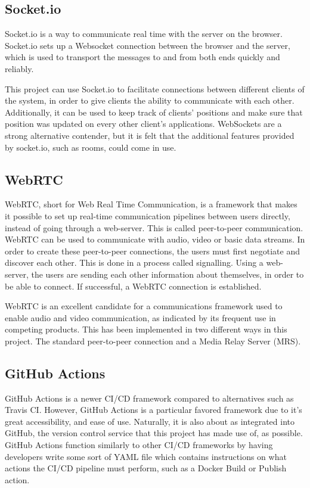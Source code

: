 \subsection{Socket.io}

Socket.io is a way to communicate real time with the server on the browser. Socket.io sets up a Websocket connection between the browser and the server, which is used to transport the messages to and from both ends quickly and reliably. \cite{socketio} 

This project can use Socket.io to facilitate connections between different clients of the system, in order to give clients the ability to communicate with each other. Additionally, it can be used to keep track of clients' positions and make sure that position was updated on every other client's applications. WebSockets are a strong alternative contender, but it is felt that the additional features provided by socket.io, such as rooms, could come in use.

\subsection{WebRTC}

WebRTC, short for Web Real Time Communication, is a framework that makes it possible to set up real-time communication pipelines between users directly, instead of going through a web-server. This is called peer-to-peer communication.  WebRTC can be used to communicate with audio, video or basic data streams. In order to create these peer-to-peer connections, the users must first negotiate and discover each other. This is done in a process called signalling. Using a web-server, the users are sending each other information about themselves, in order to be able to connect. If successful, a WebRTC connection is established. \cite{webrtc}

WebRTC is an excellent candidate for a communications framework used to enable audio and video communication, as indicated by its frequent use in competing products. This has been implemented in two different ways in this project. The standard peer-to-peer connection and a Media Relay Server (MRS). 

\subsection{GitHub Actions}

GitHub Actions is a newer CI/CD framework compared to alternatives such as Travis CI. However, GitHub Actions is a particular favored framework due to it's great accessibility, and ease of use. Naturally, it is also about as integrated into GitHub, the version control service that this project has made use of, as possible. GitHub Actions function similarly to other CI/CD frameworks by having developers write some sort of YAML file which contains instructions on what actions the CI/CD pipeline must perform, such as a Docker Build or Publish action.\cite{githubactionsdocs}

